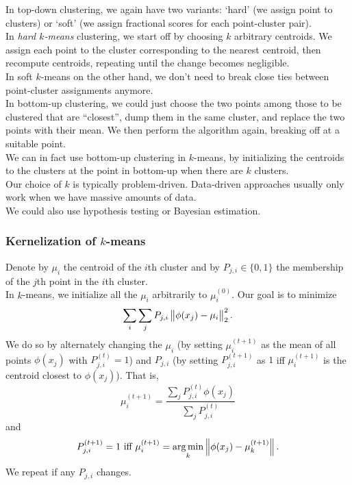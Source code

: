 \documentclass{article}
\begin{document}
			In top-down clustering, we again have two variants: `hard' (we assign point to clusters) or `soft' (we assign fractional scores for each point-cluster pair).\\
			In \emph{hard $k$-means} clustering, we start off by choosing $k$ arbitrary centroids. We assign each point to the cluster corresponding to the nearest centroid, then recompute centroids, repeating until the change becomes negligible.\\
			In soft $k$-means on the other hand, we don't need to break close ties between point-cluster assignments anymore.\\

			In bottom-up clustering, we could just choose the two points among those to be clustered that are ``closest'', dump them in the same cluster, and replace the two points with their mean. We then perform the algorithm again, breaking off at a suitable point.\\

			We can in fact use bottom-up clustering in $k$-means, by initializing the centroids to the clusters at the point in bottom-up when there are $k$ clusters.\\

			Our choice of $k$ is typically problem-driven. Data-driven approaches usually only work when we have massive amounts of data.\\
			We could also use hypothesis testing or Bayesian estimation.

		\subsubsection{Kernelization of \texorpdfstring{$k$}{k}-means}

			Denote by $\mu_i$ the centroid of the $i$th cluster and by $P_{j,i}\in\{0,1\}$ the membership of the $j$th point in the $i$th cluster.\\
			In $k$-means, we initialize all the $\mu_i$ arbitrarily to $\mu_i^{(0)}$. Our goal is to minimize
			\[ \sum_i \sum_j P_{j,i} \left\lVert\phi(x_j) - \mu_i\right\rVert_2^2. \]
			We do so by alternately changing the $\mu_i$ (by setting $\mu_i^{(t+1)}$ as the mean of all points $\phi(x_j)$ with $P_{j,i}^{(t)} = 1$) and $P_{j,i}$ (by setting $P_{j,i}^{(t+1)}$ as $1$ iff $\mu_i^{(t+1)}$ is the centroid closest to $\phi(x_j)$). That is,
			\[ \mu_i^{(t+1)} = \frac{\sum_{j} P_{j,i}^{(t)} \phi(x_j)}{\sum_j P_{j,i}^{(t)}} \]
			and
			\[ P_{j,i}^{(t+1)} = 1 \text{ iff } \mu_i^{(t+1)} = \operatorname*{arg\,min}_k \left\lVert\phi(x_j) - \mu_{k}^{(t+1)}\right\rVert. \]
			We repeat if any $P_{j,i}$ changes.\\
\end{document}
